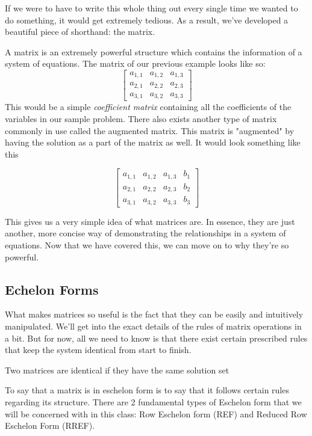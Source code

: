 If we were to have to write this whole thing out every single time we wanted to do something, it would get extremely tedious. As a result, we've developed a beautiful piece of shorthand: the matrix.

A matrix is an extremely powerful structure which contains the information of a system of equations. The matrix of our previous example looks like so:
$$
\begin{bmatrix}
a_{1,1}&a_{1,2}&a_{1,3}\\
a_{2,1}&a_{2,2}&a_{2,3}\\ 
a_{3,1}&a_{3,2}&a_{3,3}
\end{bmatrix}
$$
This would be a simple \emph{coefficient matrix} containing all the coefficients of the variables in our sample problem. There also exists another type of matrix commonly in use called the augmented matrix. This matrix is "augmented" by having the solution as a part of the matrix as well. It would look something like this

$$
\begin{bmatrix}
a_{1,1}&a_{1,2}&a_{1,3}&b_{1}\\
a_{2,1}&a_{2,2}&a_{2,3}&b_{2}\\ 
a_{3,1}&a_{3,2}&a_{3,3}&b_{3}
\end{bmatrix}
$$

This gives us a very simple idea of what matrices are. In essence, they are just another, more concise way of demonstrating the relationships in a system of equations. Now that we have covered this, we can move on to why they're so powerful.

\subsection{Echelon Forms}
What makes matrices so useful is the fact that they can be easily and intuitively manipulated. We'll get into the exact details of the rules of matrix operations in a bit. But for now, all we need to know is that there exist certain prescribed rules that keep the system identical from start to finish.

\begin{theorem}
Two matrices are identical if they have the same solution set
\end{theorem}

To say that a matrix is in eschelon form is to say that it follows certain rules regarding its structure. There are 2 fundamental types of Eschelon form that we will be concerned with in this class: Row Eschelon form (REF) and Reduced Row Eschelon Form (RREF).

